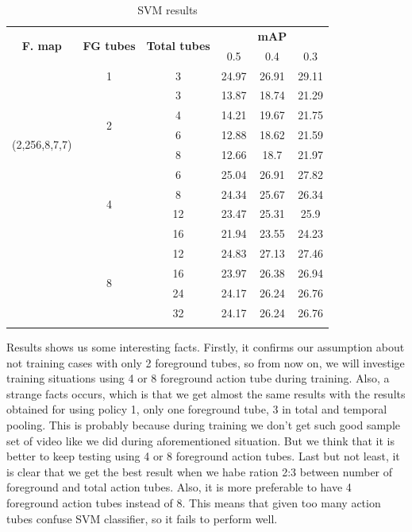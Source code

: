 \documentclass{report}
\begin{document}
\begin{center}
  \setlength{\tabcolsep}{2pt}
  \begin{longtable}{|| c | c | c || c c c||}


    \hline
    \multirow{2}{*}{\textbf{F. map}} & \multirow{2}{*}{\textbf{FG tubes}} & \multirow{2}{*}{\textbf{Total tubes}} & {} & \textbf{mAP} & {} \\
    {}  & {} & {} & 0.5 & 0.4 & 0.3 \\
    \hline
    \multirow{8}{*}{(2,256,8,7,7)} & 1 & 3 & 24.97 & 26.91 & 29.11\\
    \cline{2-6}
    {} & \multirow{4}{*}{2} & 3 & 13.87 & 18.74 & 21.29 \\
    \cline{3-6}
    {} & {} & 4 & 14.21 & 19.67 & 21.75 \\
    \cline{3-6}
    {} & {} & 6 & 12.88 & 18.62 & 21.59 \\
    \cline{3-6}
    {} & {} & 8 & 12.66 & 18.7 & 21.97 \\
    \cline{2-6}
    {} & \multirow{4}{*}{4} & 6 & 25.04 & 26.91 & 27.82  \\
    \cline{3-6}
    {} & {} &  8 & 24.34 & 25.67 & 26.34 \\
    \cline{3-6}
    {} & {} & 12 &  23.47 & 25.31 & 25.9 \\
    \cline{3-6}
    {} & {} & 16 & 21.94 & 23.55 & 24.23 \\
    \cline{2-6}
    {} & \multirow{4}{*}{8} & 12 & 24.83 & 27.13 & 27.46 \\
    \cline{3-6}
    {} & {} & 16 & 23.97 & 26.38 & 26.94 \\
    \cline{3-6}
    {} & {} & 24 & 24.17 & 26.24 & 26.76 \\
    \cline{3-6}
    {} & {} & 32 & 24.17 & 26.24 & 26.76 \\

    \hline

    \caption{SVM results }
    \label{table:svm_increased}
  \end{longtable}
\end{center}

Results shows us some interesting facts. Firstly, it confirms our assumption about not training cases with only 2 foreground tubes, so from now on,
we will investige training situations using 4 or 8 foreground action tube during training. Also, a strange facts occurs, which is that we get almost the
same results with the results obtained for using policy 1, only one foreground tube, 3 in total and temporal pooling. This is probably because
during training we don't get such good sample set of video like we did during aforementioned situation. But we think that it is better to
keep testing using 4 or 8 foreground action tubes. Last but not least, it is clear that we get the best result when we habe ration 2:3 between
number of foreground and total action tubes. Also, it is more preferable to have 4 foreground action tubes instead of 8. This means that given too
many action tubes confuse SVM classifier, so it fails to perform well.
\end{document}
